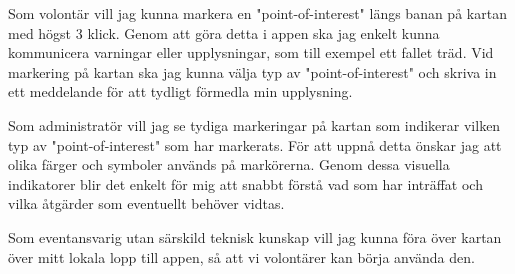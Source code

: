 \vspace{1em}

Som volontär vill jag kunna markera en "point-of-interest" längs banan på kartan med högst 3 klick. Genom att göra detta i appen ska jag enkelt kunna kommunicera varningar eller upplysningar, som till exempel ett fallet träd. Vid markering på kartan ska jag kunna välja typ av "point-of-interest" och skriva in ett meddelande för att tydligt förmedla min upplysning.
\vspace{1em}

Som administratör vill jag se tydiga markeringar på kartan som indikerar vilken typ av "point-of-interest" som har markerats. För att uppnå detta önskar jag att olika färger och symboler används på markörerna. Genom dessa visuella indikatorer blir det enkelt för mig att snabbt förstå vad som har inträffat och vilka åtgärder som eventuellt behöver vidtas.

\vspace{1em}
Som eventansvarig utan särskild teknisk kunskap vill jag kunna föra över kartan över mitt lokala lopp till appen, så att vi volontärer kan börja använda den. 



